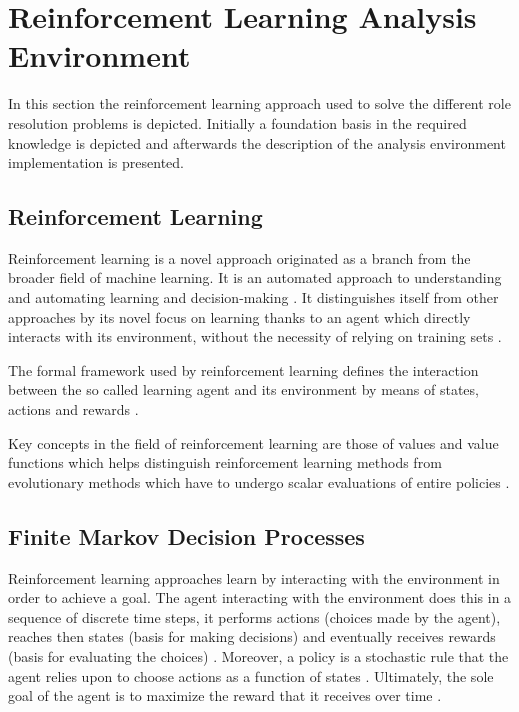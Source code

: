 \documentclass{seal_thesis}
\begin{document}
\section{Reinforcement Learning Analysis Environment}

In this section the reinforcement learning approach used to solve the different role resolution problems is depicted. Initially a foundation basis in the required knowledge is depicted and afterwards the description of the analysis environment implementation is presented.

\subsection{Reinforcement Learning}

Reinforcement learning is a novel approach originated as a branch from the broader field of machine learning. It is an automated approach to understanding and automating learning and decision-making \cite[p. 15]{Sutton1998}. It distinguishes itself from other approaches by its novel focus on learning thanks to an agent which directly interacts with its environment, without the necessity of relying on training sets \cite[p. 15]{Sutton1998}.

The formal framework used by reinforcement learning defines the interaction between the so called learning agent and its environment by means of states, actions and rewards \cite[p. 15]{Sutton1998}.

Key concepts in the field of reinforcement learning are those of values and value functions which helps distinguish reinforcement learning methods from evolutionary methods which have to undergo scalar evaluations of entire policies \cite[p. 15]{Sutton1998}.

\subsection{Finite Markov Decision Processes}

Reinforcement learning approaches learn by interacting with the environment in order to achieve a goal. The agent interacting with the environment does this in a sequence of discrete time steps, it performs actions (choices made by the agent), reaches then states (basis for making decisions) and eventually receives rewards (basis for evaluating the choices) \cite[p. 73]{Sutton1998}. Moreover, a policy is a stochastic rule that the agent relies upon to choose actions as a function of states \cite[p. 73]{Sutton1998}. Ultimately, the sole goal of the agent is to maximize the reward that it receives over time \cite[p. 73]{Sutton1998}.
\end{document}

